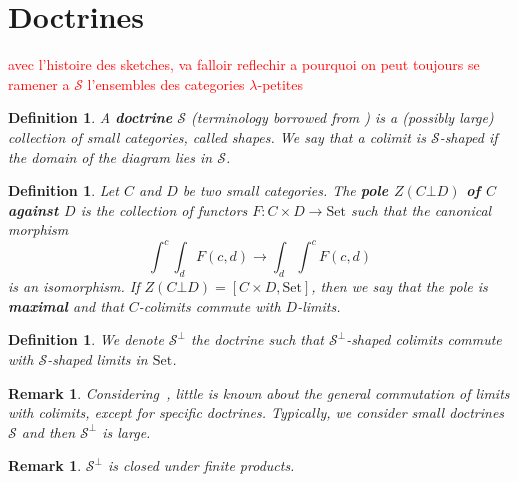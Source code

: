 \documentclass{article}
\newcommand{\Set}{\text{Set}}
\newtheorem{definition}[theorem]{Definition}
\newtheorem{remark}[theorem]{Remark}
\begin{document}
\section{Doctrines}
\textcolor{red}{avec l'histoire des sketches, va falloir reflechir a pourquoi on
  peut toujours se ramener a $\mathcal{S}$ l'ensembles des categories $\lambda$-petites}
\begin{definition}
  A \textbf{doctrine} $\mathcal{S}$ (terminology borrowed from \cite{lack_accessible}) is
  a (possibly large) collection of small categories, called shapes.
  We say that a colimit is $\mathcal{S}$-shaped if
  the domain of the diagram lies in $\mathcal{S}$.
\end{definition}
\begin{definition}
 Let $C$ and $D$ be two small categories. The \textbf{pole $Z(C\bot D)$ of $C$ against
   $D$} is the collection of functors $F:C\times D \rightarrow \Set$ such that
 the canonical morphism
 \[
   \int^c \int_d F(c,d)
   \rightarrow  \int_d \int^c F(c,d)
 \]
 is an isomorphism.
 If $Z(C\bot D) = [C\times D, \Set]$, then we say that the pole is
 \textbf{maximal} and that $C$-colimits commute with $D$-limits.
\end{definition}
\begin{definition}
  We denote $\mathcal{S}^\bot$ the doctrine such that
  $\mathcal{S}^\bot$-shaped colimits commute with 
  $\mathcal{S}$-shaped limits in $\Set$.
\end{definition}
\begin{remark}
  Considering~\cite{lack_accessible, commutationlim}, little is known about the
  general commutation of limits with colimits, except for specific doctrines.
  Typically, we consider small doctrines $\mathcal{S}$ and then
  $\mathcal{S}^\bot$ is large.
\end{remark}
\begin{remark}
$\mathcal{S}^\bot$ is closed under finite products.
\end{remark}
\end{document}
